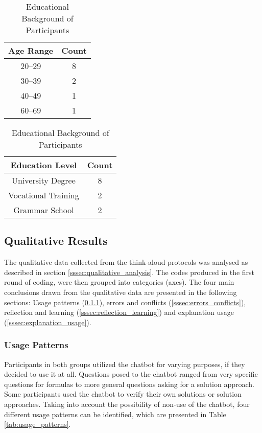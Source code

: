 \begin{table}[ht]
    \parbox{.45\linewidth}{
        \centering
        \begin{tabular}{cc}
            Age Range & Count \\
            \hline
            20--29 & 8 \\
            30--39 & 2 \\
            40--49 & 1 \\
            60--69 & 1
        \end{tabular}
        \caption{Age Distribution of Participants}
        \label{tab:age_dist}
    }
    \hfill
    \parbox{.45\linewidth}{
        \begin{tabular}{cc}
            Education Level & Count \\
            \hline
            University Degree & 8 \\
            Vocational Training & 2 \\
            Grammar School & 2
        \end{tabular}
        \caption{Educational Background of Participants}
        \label{tab:edu_bg}
    }
\end{table}

\endgroup

\subsection{Qualitative Results} \label{ssec:qual_results}

The qualitative data collected from the think-aloud protocols was analysed as described in section \ref{sssec:qualitative_analysis}. The codes produced in the first round of coding, were then grouped into categories (axes). The four main conclusions drawn from the qualitative data are presented in the following sections: Usage patterns (\ref{sssec:usage_patterns}), errors and conflicts (\ref{sssec:errors_conflicts}), reflection and learning (\ref{sssec:reflection_learning}) and explanation usage (\ref{sssec:explanation_usage}).

\subsubsection{Usage Patterns} \label{sssec:usage_patterns}

Participants in both groups utilized the chatbot for varying purposes, if they decided to use it at all. Questions posed to the chatbot ranged from very specific questions for formulas to more general questions asking for a solution approach. Some participants used the chatbot to verify their own solutions or solution approaches. Taking into account the possibility of non-use of the chatbot, four different usage patterns can be identified, which are presented in Table \ref{tab:usage_patterns}.

